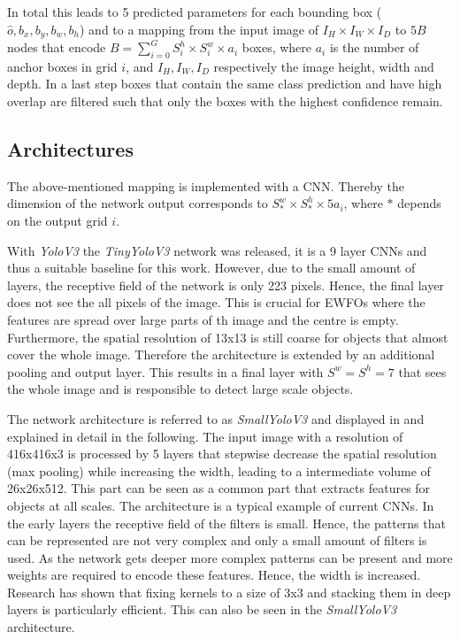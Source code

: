 In total this leads to 5 predicted parameters for each bounding box ($\hat o,b_x,b_y,b_w,b_h$) and to a mapping from the input image of $I_H\times I_W\times I_D$ to $5B$ nodes that encode $B=\sum_{i=0}^{G}S^h_i\times S^w_i\times a_i$ boxes, where $a_i$ is the number of anchor boxes in grid $i$, and $I_H, I_W, I_D$ respectively the image height, width and depth. In a last step boxes that contain the same class prediction and have high overlap are filtered such that only the boxes with the highest confidence remain. 

\subsection{Architectures}

The above-mentioned mapping is implemented with a \ac{CNN}. Thereby the dimension of the network output corresponds to $S^w_*\times S^h_*\times 5a_i$, where $*$ depends on the output grid $i$.

With \textit{YoloV3} the \textit{TinyYoloV3} network was released, it is a 9 layer \acp{CNN} and thus a suitable baseline for this work. However, due to the small amount of layers, the receptive field of the network is only 223 pixels. Hence, the final layer does not see the all pixels of the image. This is crucial for \acp{EWFO} where the features are spread over large parts of th image and the centre is empty. Furthermore, the spatial resolution of 13x13 is still coarse for objects that almost cover the whole image. Therefore the architecture is extended by an additional pooling and output layer. This results in a final layer with $S^w = S^h = 7$ that sees the whole image and is responsible to detect large scale objects. 

The network architecture is referred to as \textit{SmallYoloV3} and displayed in  and explained in detail in the following. The input image with a resolution of 416x416x3 is processed by 5 layers that stepwise decrease the spatial resolution (max pooling) while increasing the width, leading to a intermediate volume of 26x26x512. This part can be seen as a common part that extracts features for objects at all scales. The architecture is a typical example of current \acp{CNN}. In the early layers the receptive field of the filters is small. Hence, the patterns that can be represented are not very complex and only a small amount of filters is used. As the network gets deeper more complex patterns can be present and more weights are required to encode these features. Hence, the width is increased. Research has shown that fixing kernels to a size of 3x3 and stacking them in deep layers is particularly efficient\cite{SimonyanZ14a}. This can also be seen in the \textit{SmallYoloV3} architecture. 

